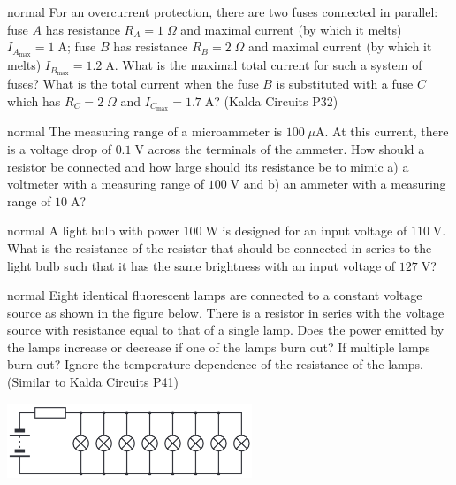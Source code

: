 \hypertarget{P1}{}
\begin{solution}{normal} %
For an overcurrent protection, there are two fuses connected in parallel: fuse $A$ has resistance $R_A= 1\;\Omega$ and maximal current (by which it melts) $I_{A_\text{max}}= 1 \;\text{A}$; fuse $B$ has resistance $R_B= 2\;\Omega$ and maximal current (by which it melts) $I_{B_\text{max}}= 1.2\;\text{A}$. What is the maximal total current for such a system of fuses? What is the total current when the fuse $B$ is substituted with a fuse $C$ which has $R_C= 2\;\Omega$ and $I_{C_\text{max}}= 1.7\;\text{A}$? (Kalda Circuits P32)
\end{solution}

\hypertarget{P2}{}
\begin{solution}{normal} %
The measuring range of a microammeter is $100\;\mu\text{A}$. At this current, there is a voltage drop of $0.1\;\text{V}$ across the terminals of the ammeter. How should a resistor be connected and how large should its resistance be to mimic a) a voltmeter with a measuring range of $100\;\text{V}$ and b) an ammeter with a measuring range of $10\;\text{A}$?
\end{solution}

\hypertarget{P3}{}
\begin{solution}{normal} %
A light bulb with power $100\;\text{W}$ is designed for an input voltage of $110\;\text{V}$. What is the resistance of the resistor that should be connected in series to the light bulb such that it has the same brightness with an input voltage of $127\;\text{V}$?
\end{solution}

\hypertarget{P4}{}
\begin{solution}{normal} %
Eight identical fluorescent lamps are connected to a constant voltage source as shown in the figure below. There is a resistor in series with the voltage source with resistance equal to that of a single lamp. Does the power emitted by the lamps increase or decrease if one of the lamps burn out? If multiple lamps burn out? Ignore the temperature dependence of the resistance of the lamps. (Similar to Kalda Circuits P41)
\begin{center}
    \includegraphics[width=0.55\textwidth]{S1 Figures/S1-4.png}
\end{center}
\end{solution}

